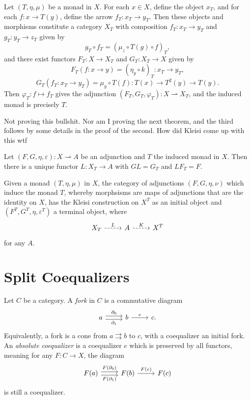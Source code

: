 \begin{theorem}\label{thm:6.3}
	Let $(T,\eta,\mu)$ be a monad in $X$. For each $x\in X$, define the object $x_T$, and for each $f : x \to T(y)$, define the arrow $f_T : x_T \to y_T$. Then these objects and morphisms constitute a category $X_T$ with composition $f_T : x_T \to y_T$ and $g_T : y_T \to z_T$ given by
	\[
		g_T \circ f_T = (\mu_z \circ T(g)\circ f)_T,
	\]
	and there exist functors $F_T : X \to X_T$ and $G_T : X_T \to X$ given by
	\[
		F_T(f : x \to y)=(\eta_y \circ k)_T : x_T \to y_T,
	\]
	\[
		G_T(f_T : x_T \to y_T)=\mu_y \circ T(f): T(x) \to T^2(y)\to T(y)
	.\]
	Then $\varphi_T : f \mapsto f_T$ gives the adjunction $(F_T,G_T,\varphi_T) : X \rightharpoonup X_T$, and the induced monad is precisely $T$.
\end{theorem}

Not proving this bullshit. Nor am I proving the next theorem, and the third follows by some details in the proof of the second. How did Kleisi come up with this wtf

\begin{theorem}\label{thm:6.4}
	Let $(F,G,\eta,\varepsilon ) : X\rightharpoonup A$ be an adjunction and $T$ the induced monad in $X$. Then there is a unique functor $L : X_T \to A$ with $GL=G_T$ and $LF_T=F$.
\end{theorem}
\begin{theorem}\label{thm:6.5}
	Given a monad $(T,\eta,\mu)$ in $X$, the category of adjunctions $(F,G,\eta,\nu)$ which induce the monad $T$, whereby morphsisms are maps of adjunctions that are the identity on $X$, has the Kleisi construction on $X^T$ as an initial object and $(F^T,G^T,\eta,\varepsilon ^T)$ a terminal object, where
	\[\begin{tikzcd}[row sep = 2.5em, column sep = 2.5em]
	X_T \ar[" L ", dashed, r]  & A\ar[" K ", dashed, r]  & X^T
	\end{tikzcd}\]
	for any $A$.
\end{theorem}

\section{Split Coequalizers}

\begin{definition}\label{dfn:6.3}
	Let $C$ be a category. A \emph{fork} in $C$ is a commutative diagram
	\[\begin{tikzcd}[row sep = 2.5em, column sep = 2.5em]
	a\ar[" \partial _0 ", shift left, r] \ar[" \partial _1 "', shift right, r]  & b \ar[" e ", r]  & c.
	\end{tikzcd}\]
	Equivalently, a fork is a cone from $a\rightrightarrows b$ to $c$, with a coequalizer an initial fork. An \emph{absolute coequalizer} is a coequalizer $e$ which is preserved by all functors, meaning for any $F : C \to X$, the diagram
	\[\begin{tikzcd}[row sep = 2.5em, column sep = 2.5em]
	F(a)\ar[" F(\partial _0) ", shift left, r] \ar[" F(\partial _1) "', shift right, r]  & F(b)\ar[" F(e) ", r]  & F(c)
	\end{tikzcd}\]
	is still a coequalizer.
\end{definition}


